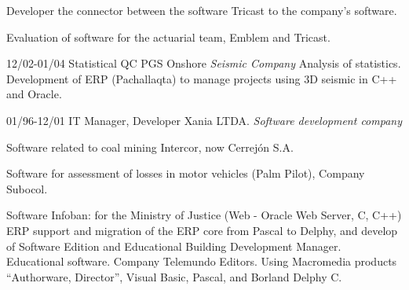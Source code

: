 \begin{entrylist}
{Developer the connector between the software Tricast to the company's software.

Evaluation of software for the actuarial team, Emblem and Tricast.}

  \entry
	{12/02-01/04}
	{Statistical QC}
	{PGS Onshore {\sl Seismic Company}}
	{Analysis of statistics. Development of ERP (Pachallaqta) to manage projects
	using 3D seismic in C++ and Oracle.}

  \entry
	{01/96-12/01}
	{IT Manager, Developer}
	{Xania LTDA. {\sl Software development company}}
	{Software related to coal mining Intercor, now Cerrejón S.A.

Software for assessment of losses in motor vehicles (Palm Pilot), Company
Subocol.

Software Infoban: for the Ministry of Justice (Web - Oracle Web Server, C, C++)
ERP support and migration of the ERP core from Pascal to Delphy, and develop
of Software Edition and Educational Building Development Manager.
Educational software. Company Telemundo Editors. Using Macromedia
products “Authorware, Director”, Visual Basic, Pascal, and Borland Delphy C.


}

  \end{entrylist}
